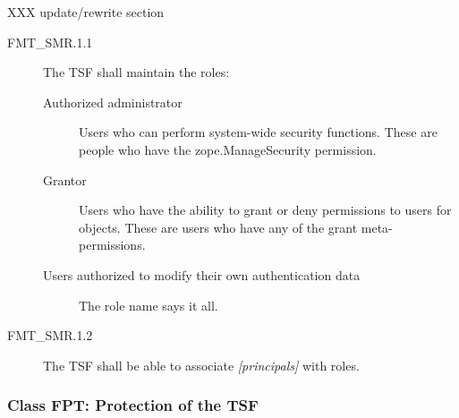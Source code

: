 \documentclass[10pt,a4paper,english]{article}
\begin{document}
XXX update/rewrite section
\begin{description}
\item[FMT{\_}SMR.1.1]

The TSF shall maintain the roles:
\begin{description}
\item[Authorized administrator]

Users who can perform system-wide security functions. These are
people who have the zope.ManageSecurity permission.

\item[Grantor ]

Users who have the ability to grant or deny permissions to
users for objects.  These are users who have any of the grant
meta-permissions.

\item[Users authorized to modify their own authentication data]

The role name says it all.

\end{description}

\item[FMT{\_}SMR.1.2]

The TSF shall be able to associate \emph{{[}principals]} with roles.

\end{description}



\hypertarget{class-fpt-protection-of-the-tsf}{}
\subsubsection*{Class FPT: Protection of the TSF}



\hypertarget{fpt-amt-1-abstract-machine-testing}{}
\end{document}

